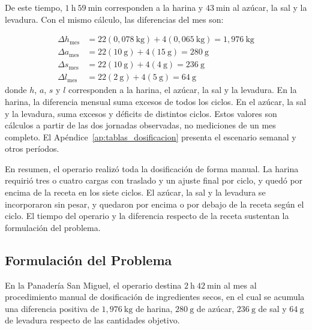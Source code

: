 De este tiempo, $1\ \mathrm{h}\ 59\ \mathrm{min}$ corresponden a la harina
y $43\ \mathrm{min}$ al azúcar, la sal y la levadura. Con el mismo cálculo,
las diferencias del mes son:

\begin{align*}
\Delta h_{\mathrm{mes}} &= 22(0{,}078\ \mathrm{kg}) + 4(0{,}065\ \mathrm{kg}) = 1{,}976\ \mathrm{kg}\\
\Delta a_{\mathrm{mes}} &= 22(10\ \mathrm{g}) + 4(15\ \mathrm{g}) = 280\ \mathrm{g}\\
\Delta s_{\mathrm{mes}} &= 22(10\ \mathrm{g}) + 4(4\ \mathrm{g}) = 236\ \mathrm{g}\\
\Delta l_{\mathrm{mes}} &= 22(2\ \mathrm{g}) + 4(5\ \mathrm{g}) = 64\ \mathrm{g}
\end{align*}
donde $h$, $a$, $s$ y $l$ corresponden a la harina, el azúcar, la sal y la
levadura. En la harina, la diferencia mensual suma excesos de todos los
ciclos. En el azúcar, la sal y la levadura, suma excesos y déficits de
distintos ciclos. Estos valores son cálculos a partir de las dos jornadas
observadas, no mediciones de un mes completo. El
Apéndice~\ref{ap:tablas_dosificacion} presenta el escenario semanal y
otros períodos.

En resumen, el operario realizó toda la dosificación de forma manual. La
harina requirió tres o cuatro cargas con traslado y un ajuste final por
ciclo, y quedó por encima de la receta en los siete ciclos. El azúcar, la
sal y la levadura se incorporaron sin pesar, y quedaron por encima o por
debajo de la receta según el ciclo. El tiempo del operario y la
diferencia respecto de la receta sustentan la formulación del problema.


\subsection{Formulación del Problema}
\label{subsec:formulacion_problema}

En la Panadería San Miguel, el operario destina
$2\ \mathrm{h}\ 42\ \mathrm{min}$ al mes al procedimiento manual de
dosificación de ingredientes secos, en el cual se acumula una diferencia
positiva de $1{,}976\ \mathrm{kg}$ de harina, $280\ \mathrm{g}$ de azúcar,
$236\ \mathrm{g}$ de sal y $64\ \mathrm{g}$ de levadura respecto de las
cantidades objetivo.

